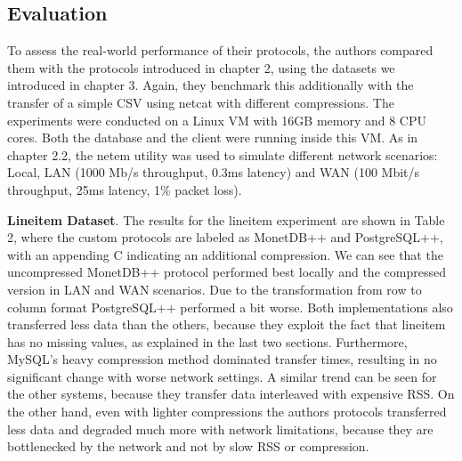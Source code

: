 \documentclass[sigconf]{acmart}
\begin{document}
\subsection{Evaluation}
To assess the real-world performance of their protocols, the authors compared them with the protocols introduced in chapter 2, using the datasets we introduced in chapter 3. Again, they benchmark this additionally with the transfer of a simple CSV using netcat with different compressions. The experiments were conducted on a Linux VM with 16GB memory and 8 CPU cores. Both the database and the client were running inside this VM. As in chapter 2.2, the netem utility was used to simulate different network scenarios: Local, LAN (1000 Mb/s throughput, 0.3ms latency) and WAN (100 Mbit/s throughput, 25ms latency, 1\% packet loss).

\textbf{Lineitem Dataset}.
The results for the lineitem experiment are shown in Table 2, where the custom protocols are labeled as MonetDB++ and PostgreSQL++, with an appending C indicating an additional compression. We can see that the uncompressed MonetDB++ protocol performed best locally and the compressed version in LAN and WAN scenarios. Due to the transformation from row to column format PostgreSQL++ performed a bit worse. Both implementations also transferred less data than the others, because they exploit the fact that lineitem has no missing values, as explained in the last two sections. Furthermore, MySQL's heavy compression method dominated transfer times, resulting in no significant change with worse network settings. A similar trend can be seen for the other systems, because they transfer data interleaved with expensive RSS. On the other hand, even with lighter compressions the authors protocols transferred less data and degraded much more with network limitations, because they are bottlenecked by the network and not by slow RSS or compression. 
\end{document}

